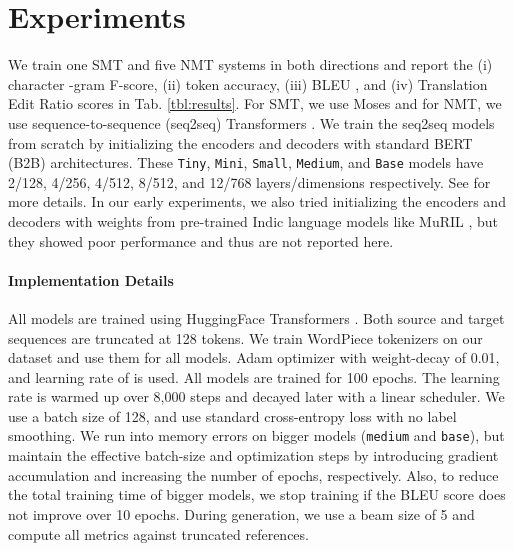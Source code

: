 \documentclass[11pt,a4paper]{article}
\begin{document}
\section{Experiments}\label{sec:expts}
We train one SMT and five NMT systems in both directions and report the (i) character -gram F-score, (ii) token accuracy, (iii) BLEU \cite{bleu}, and (iv) Translation Edit Ratio \cite[TER]{ter} scores in Tab. \ref{tbl:results}. For SMT, we use Moses \cite{moses} and for NMT, we use sequence-to-sequence (seq2seq) Transformers \cite{transformer}. We train the seq2seq models from scratch by initializing the encoders and decoders with standard BERT (B2B) architectures. These {\tt Tiny}, {\tt Mini}, {\tt Small}, {\tt Medium}, and {\tt Base} models have 2/128, 4/256, 4/512, 8/512, and 12/768 layers/dimensions respectively. See  for more details. In our early experiments, we also tried initializing the encoders and decoders with weights from pre-trained Indic language models like MuRIL \cite{muril}, but they showed poor performance and thus are not reported here.

\paragraph{Implementation Details}
All models are trained using HuggingFace Transformers \cite{hf}. Both source and target sequences are truncated at 128 tokens. We train WordPiece tokenizers on our dataset and use them for all models. Adam optimizer \cite{adam} with weight-decay of 0.01, and learning rate of  is used. All models are trained for 100 epochs. The learning rate is warmed up over 8,000 steps and decayed later with a linear scheduler. We use a batch size of 128, and use standard cross-entropy loss with no label smoothing. We run into memory errors on bigger models ({\tt medium} and {\tt base}), but maintain the effective batch-size and optimization steps by introducing gradient accumulation and increasing the number of epochs, respectively. Also, to reduce the total training time of bigger models, we stop training if the BLEU score does not improve over 10 epochs. During generation, we use a beam size of 5 and compute all metrics against truncated references.
\end{document}
